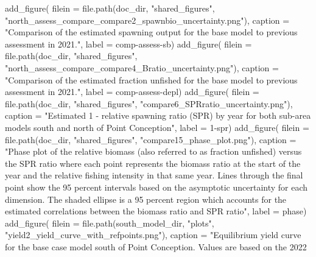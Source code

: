 \documentclass[
  letterpaper,
]{article}
\newenvironment{Shaded}{\begin{snugshade}}{\end{snugshade}}
\newcommand{\AttributeTok}[1]{\textcolor[rgb]{0.77,0.63,0.00}{#1}}
\newcommand{\FunctionTok}[1]{\textcolor[rgb]{0.00,0.00,0.00}{#1}}
\newcommand{\NormalTok}[1]{#1}
\newcommand{\StringTok}[1]{\textcolor[rgb]{0.31,0.60,0.02}{#1}}
\begin{document}
\begin{Shaded}
\begin{Highlighting}[]
\FunctionTok{add\_figure}\NormalTok{(}
\AttributeTok{filein =} \FunctionTok{file.path}\NormalTok{(doc\_dir, }\StringTok{"shared\_figures"}\NormalTok{, }\StringTok{"north\_assess\_compare\_compare2\_spawnbio\_uncertainty.png"}\NormalTok{),}
\AttributeTok{caption =} \StringTok{"Comparison of the estimated spawning output for the base model to previous assessment in 2021."}\NormalTok{,}
\AttributeTok{label =} \StringTok{\textquotesingle{}comp{-}assess{-}sb\textquotesingle{}}\NormalTok{)}
\FunctionTok{add\_figure}\NormalTok{(}
\AttributeTok{filein =} \FunctionTok{file.path}\NormalTok{(doc\_dir, }\StringTok{"shared\_figures"}\NormalTok{, }\StringTok{"north\_assess\_compare\_compare4\_Bratio\_uncertainty.png"}\NormalTok{),}
\AttributeTok{caption =} \StringTok{"Comparison of the estimated fraction unfished for the base model to previous assessment in 2021."}\NormalTok{,}
\AttributeTok{label =} \StringTok{\textquotesingle{}comp{-}assess{-}depl\textquotesingle{}}\NormalTok{)}
\FunctionTok{add\_figure}\NormalTok{(}
\AttributeTok{filein =} \FunctionTok{file.path}\NormalTok{(doc\_dir, }\StringTok{"shared\_figures"}\NormalTok{, }\StringTok{"compare6\_SPRratio\_uncertainty.png"}\NormalTok{), }
\AttributeTok{caption =} \StringTok{"Estimated 1 {-} relative spawning ratio (SPR) by year for both sub{-}area models south and north of Point Conception"}\NormalTok{,}
\AttributeTok{label =} \StringTok{\textquotesingle{}1{-}spr\textquotesingle{}}\NormalTok{)}
\FunctionTok{add\_figure}\NormalTok{(}
\AttributeTok{filein =} \FunctionTok{file.path}\NormalTok{(doc\_dir, }\StringTok{"shared\_figures"}\NormalTok{, }\StringTok{"compare15\_phase\_plot.png"}\NormalTok{), }
\AttributeTok{caption =} \StringTok{"Phase plot of the relative biomass (also referred to as fraction unfished) versus the SPR ratio where each point represents the biomass ratio at the start of the year and the relative fishing intensity in that same year. Lines through the final point show the 95 percent intervals based on the asymptotic uncertainty for each dimension. The shaded ellipse is a 95 percent region which accounts for the estimated correlations between the biomass ratio and SPR ratio"}\NormalTok{,}
\AttributeTok{label =} \StringTok{\textquotesingle{}phase\textquotesingle{}}\NormalTok{)}
\FunctionTok{add\_figure}\NormalTok{(}
\AttributeTok{filein =} \FunctionTok{file.path}\NormalTok{(south\_model\_dir, }\StringTok{"plots"}\NormalTok{, }\StringTok{"yield2\_yield\_curve\_with\_refpoints.png"}\NormalTok{), }
\AttributeTok{caption =} \StringTok{"Equilibrium yield curve for the base case model south of Point Conception. Values are based on the 2022}

\end{Highlighting}
\end{Shaded}
\end{document}
